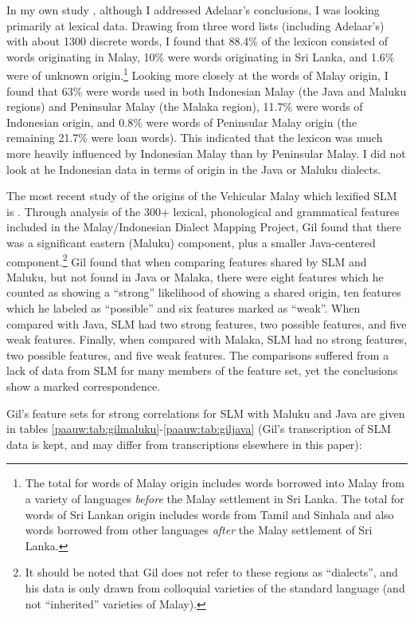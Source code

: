 In my own study \citep{Paauw2004}, although I addressed Adelaar's conclusions, I was looking primarily at lexical data. Drawing from three word lists (including Adelaar's) with about 1300 discrete words, I found that 88.4\% of the lexicon consisted of words originating in Malay, 10\% were words originating in Sri Lanka, and 1.6\% were of unknown origin.\footnote{The
 total for words of Malay origin includes words borrowed into Malay from a variety of languages \textit{before} the Malay settlement in Sri Lanka. The total for words of Sri Lankan origin includes words from Tamil and Sinhala and also words borrowed from other languages \textit{after} the Malay settlement of Sri Lanka.
} 
Looking more closely at the words of Malay origin, I found that 63\% were words used in both Indonesian Malay (the Java and Maluku regions) and Peninsular Malay (the Malaka region), 11.7\% were words of Indonesian origin, and 0.8\% were words of Peninsular Malay origin (the remaining 21.7\% were loan words).  This indicated that the lexicon was much more heavily influenced by Indonesian Malay than by Peninsular Malay. I did not look at he Indonesian data in terms of origin in the Java or Maluku dialects.

The most recent study of the origins of the Vehicular Malay which lexified SLM is \citet{Gil2010}.  Through analysis of the 300+ lexical, phonological and grammatical features included in the Malay/Indonesian Dialect Mapping Project, Gil found that there was a significant eastern (Maluku) component, plus a smaller Java-centered component.\footnote{It 
 should be noted that Gil does not refer to these regions as ``dialects'', and his data is only drawn from colloquial varieties of the standard language (and not ``inherited'' varieties of Malay).
} 
Gil found that when comparing features shared by SLM and Maluku, but not found in Java or Malaka, there were eight features which he counted as showing a ``strong'' likelihood of showing a shared origin, ten features which he labeled as ``possible'' and six features marked as ``weak''. When compared with Java, SLM had two strong features, two possible features, and five weak features. Finally, when compared with Malaka, SLM had no strong features, two possible features, and five weak features. The comparisons suffered from a lack of data from SLM for many members of the feature set, yet the conclusions show a marked correspondence.

Gil's feature sets for strong correlations for SLM with Maluku and Java are given in tables \ref{paauw:tab:gilmaluku}-\ref{paauw:tab:giljava} (Gil's transcription of SLM data is kept, and may differ from transcriptions elsewhere in this paper):

